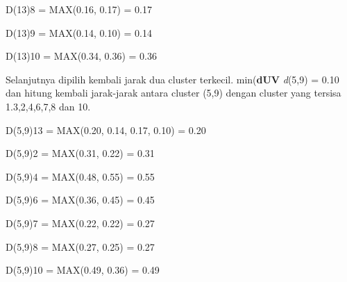 \begin{enumerate}
D(13)8 = MAX(0.16, 0.17) = 0.17

D(13)9 = MAX(0.14, 0.10) = 0.14

D(13)10 = MAX(0.34, 0.36) = 0.36

\begin{table}[htbp]
\captionsetup{singlelinecheck=off}
\caption{Matrik Jarak, d(1,3)}
\label{tab:my-table}
\end{table}

Selanjutnya dipilih kembali jarak dua cluster terkecil. min(\textbf{dUV} \textit{d}(5,9) = 0.10 dan hitung kembali jarak-jarak antara cluster (5,9) dengan cluster yang tersisa 1.3,2,4,6,7,8 dan 10.

D(5,9)13 = MAX(0.20, 0.14, 0.17, 0.10) = 0.20

D(5,9)2  = MAX(0.31, 0.22) = 0.31

D(5,9)4 = MAX(0.48, 0.55) = 0.55

D(5,9)6 = MAX(0.36, 0.45) = 0.45

D(5,9)7 = MAX(0.22, 0.22) = 0.27

D(5,9)8 = MAX(0.27, 0.25) = 0.27

D(5,9)10 = MAX(0.49, 0.36) = 0.49



\end{enumerate}
